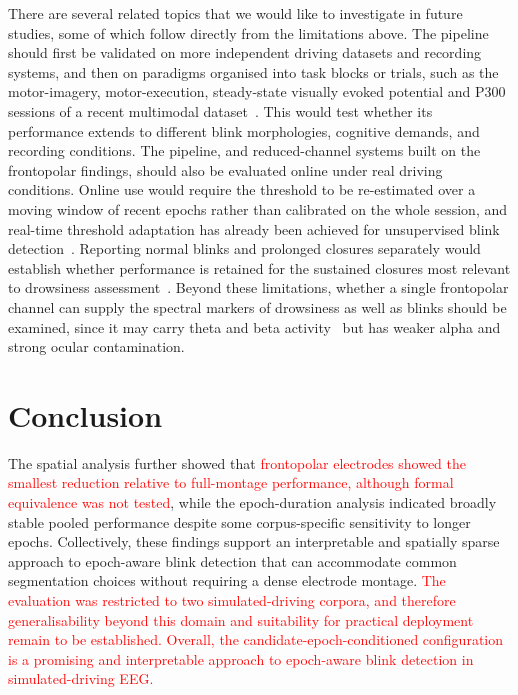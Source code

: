 \documentclass[journal,twoside,web]{ieeecolor}
\newcommand{\rev}[1]{\textcolor{red}{#1}}
\begin{document}
%

 
%
There are several related topics that we would like to investigate in future studies, some of which follow directly from the limitations above.
%
The pipeline should first be validated on more independent driving datasets and recording systems, and then on paradigms organised into task blocks or trials, such as the motor-imagery, motor-execution, steady-state visually evoked potential and P300 sessions of a recent multimodal dataset~\citep{guttmann2025dataset}. This would test whether its performance extends to different blink morphologies, cognitive demands, and recording conditions. The pipeline, and reduced-channel systems built on the frontopolar findings, should also be evaluated online under real driving conditions. Online use would require the threshold to be re-estimated over a moving window of recent epochs rather than calibrated on the whole session, and real-time threshold adaptation has already been achieved for unsupervised blink detection~\citep{chang2016unsupervised}. Reporting normal blinks and prolonged closures separately would establish whether performance is retained for the sustained closures most relevant to drowsiness assessment~\citep{tian2021fatigue,shahbakhti2023fusion}.
%
Beyond these limitations, whether a single frontopolar channel can supply the spectral markers of drowsiness as well as blinks should be examined, since it may carry theta and beta activity~\citep{ko2020eyeblink,shahbakhti2022simultaneous,aoki2023drowsiness} but has weaker alpha and strong ocular contamination.


\section{Conclusion}
\label{sec:conclusion}
%
%
%
The spatial analysis further showed that \rev{frontopolar electrodes showed the smallest reduction relative to full-montage performance, although formal equivalence was not tested}, while the epoch-duration analysis indicated broadly stable pooled performance despite some corpus-specific sensitivity to longer epochs. Collectively, these findings support an interpretable and spatially sparse approach to epoch-aware blink detection that can accommodate common segmentation choices without requiring a dense electrode montage.
\rev{The evaluation was restricted to two simulated-driving corpora, and therefore generalisability beyond this domain and suitability for practical deployment remain to be established.}
\rev{Overall, the candidate-epoch-conditioned configuration is a promising and interpretable approach to epoch-aware blink detection in simulated-driving EEG.}
  
\end{document}
